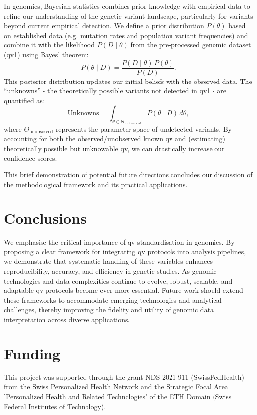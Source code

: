 In genomics, Bayesian statistics combines prior knowledge with empirical data to refine our understanding of the genetic variant landscape, particularly for variants beyond current empirical detection. We define a prior distribution \(P(\theta)\) based on established data (e.g. mutation rates and population variant frequencies) and combine it with the likelihood \(P(D\mid\theta)\) from the pre-processed genomic dataset (\ac{qv}1) using Bayes' theorem:
$$
P(\theta\mid D) = \frac{P(D\mid\theta) \, P(\theta)}{P(D)}.
$$
This posterior distribution updates our initial beliefs with the observed data. The ``unknowns'' - the theoretically possible variants not detected in \ac{qv}1 - are quantified as:
$$
\text{Unknowns} = \int_{\theta \in \Theta_{\text{unobserved}}} P(\theta\mid D) \, d\theta,
$$
where \(\Theta_{\text{unobserved}}\) represents the parameter space of undetected variants. 
By accounting for both the observed/unobserved known \ac{qv} and (estimating) theoretically possible but unknowable \ac{qv}, we can drastically increase our confidence scores.

This brief demonstration of potential future directions concludes our discussion of the methodological framework and its practical applications.

\section{Conclusions}
We emphasise the critical importance of \ac{qv} standardisation in genomics. By proposing a clear framework for integrating \ac{qv} protocols into analysis pipelines, we demonstrate that systematic handling of these variables enhances reproducibility, accuracy, and efficiency in genetic studies. As genomic technologies and data complexities continue to evolve, robust, scalable, and adaptable \ac{qv} protocols become ever more essential. Future work should extend these frameworks to accommodate emerging technologies and analytical challenges, thereby improving the fidelity and utility of genomic data interpretation across diverse applications.

\section{Funding}
This project was supported through the grant NDS-2021-911 (SwissPedHealth) from the Swiss Personalized Health Network and the Strategic Focal Area 'Personalized Health and Related Technologies' of the ETH Domain (Swiss Federal Institutes of Technology).

